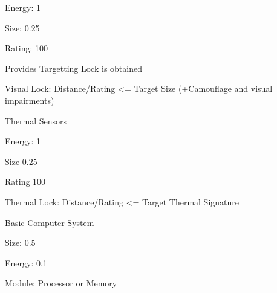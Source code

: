 Energy: 1\par
Size: 0.25 \par
Rating: 100\par
Provides Targetting Lock is obtained\par
Visual Lock: Distance/Rating <= Target Size (+Camouflage and visual impairments)\par
\par
Thermal Sensors\par
Energy: 1\par
Size 0.25\par
Rating 100\par
Thermal Lock: Distance/Rating <= Target Thermal Signature\par
\par
Basic Computer System\par
Size: 0.5\par
Energy: 0.1\par
Module: Processor or Memory\par
\par
